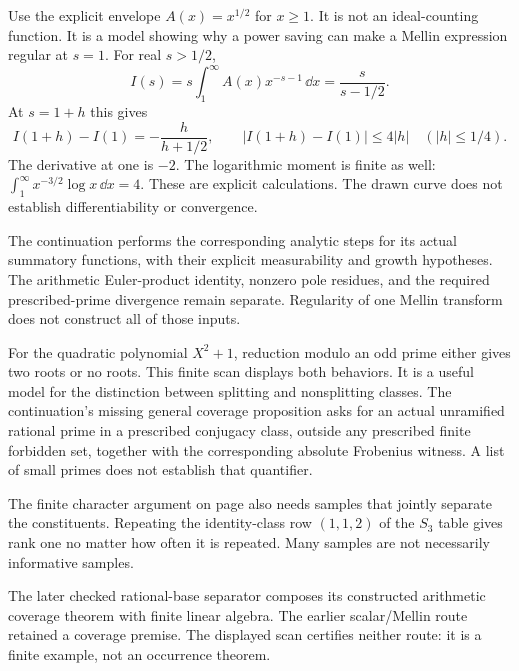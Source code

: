 Use the explicit envelope $A(x)=x^{1/2}$ for $x\ge1$. It is not an ideal-counting function. It is a model showing why a power saving can make a Mellin expression regular at $s=1$.
For real $s>1/2$,
\[
I(s)=s\int_1^\infty A(x)x^{-s-1}\,\dd x
=\frac{s}{s-1/2}.
\]
At $s=1+h$ this gives
\[
I(1+h)-I(1)=-\frac{h}{h+1/2},
\qquad |I(1+h)-I(1)|\le4|h|
\quad (|h|\le1/4).
\]
The derivative at one is $-2$. The logarithmic moment is finite as well: $\int_1^\infty x^{-3/2}\log x\,\dd x=4$. These are explicit calculations. The drawn curve does not establish differentiability or convergence.

The continuation performs the corresponding analytic steps for its actual summatory functions, with their explicit measurability and growth hypotheses. The arithmetic Euler-product identity, nonzero pole residues, and the required prescribed-prime divergence remain separate. Regularity of one Mellin transform does not construct all of those inputs.

For the quadratic polynomial $X^2+1$, reduction modulo an odd prime either gives two roots or no roots. This finite scan displays both behaviors. It is a useful model for the distinction between splitting and nonsplitting classes.
The continuation's missing general coverage proposition asks for an actual unramified rational prime in a prescribed conjugacy class, outside any prescribed finite forbidden set, together with the corresponding absolute Frobenius witness. A list of small primes does not establish that quantifier.

The finite character argument on page  also needs samples that jointly separate the constituents. Repeating the identity-class row $(1,1,2)$ of the $S_3$ table gives rank one no matter how often it is repeated. Many samples are not necessarily informative samples.

The later checked rational-base separator composes its constructed arithmetic coverage theorem with finite linear algebra. The earlier scalar/Mellin route retained a coverage premise. The displayed scan certifies neither route: it is a finite example, not an occurrence theorem.

